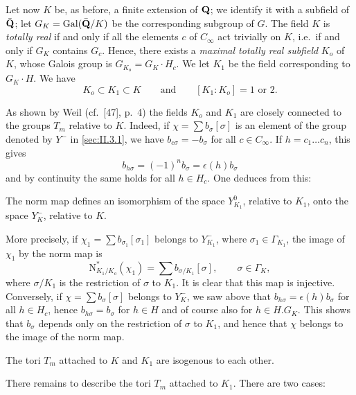 Let now $K$ be, as before, a finite extension of $\mathbf{Q}$; we identify it
with a subfield of $\bar{\mathbf{Q}}$; let $G_K = \mathrm{Gal}(\bar{\mathbf{Q}}/K)$ be the
corresponding subgroup of $G$.  The field $K$ is \emph{totally real} if
and only if all the elements $c$ of $C_\infty$ act trivially on $K$,
i.e.~if and only if $G_K$ contains $G_c$.  Hence, there exists a
\emph{maximal totally real subfield} $K_o$ of $K$, whose Galois group is
$G_{K_o} = G_K \cdot H_c$.  We let $K_1$ be the field corresponding to
$G_K \cdot H$.  We have
\[
K_o \subset K_1 \subset K \qquad\text{and}\qquad [K_1 : K_o] = 1
\text{ or } 2.
\]

As shown by Weil (cf.~[47], p.~4) the fields $K_o$ and
$K_1$ are closely connected to the groups $T_m$ relative to $K$.
Indeed, if $\chi = \sum b_\sigma[\sigma]$ is an element of the group
denoted by $Y^-$ in \ref{sec:II.3.1}, we have $b_{c\sigma} = -b_\sigma$ for all
$c \in C_\infty$.  If $h = c_1 \ldots c_n$, this gives
\[
b_{h\sigma} = (-1)^n b_\sigma = \epsilon(h) b_\sigma
\]
and by continuity the same holds for all $h \in H_c$.  One deduces from
this:

\begin{proposition}\label{prop:II.3.3.1}
The norm map defines an isomorphism of the space $Y^0_{K_1}$, relative
to $K_1$, onto the space $Y^-_K$, relative to $K$.
\end{proposition}

More precisely, if $\chi_1 = \sum b_{\sigma_1}[\sigma_1]$ belongs to
$Y^-_{K_1}$, where $\sigma_1 \in \Gamma_{K_1}$, the image of $\chi_1$ by
the norm map is
\[
\mathrm{N}^*_{K_1/K_o}(\chi_1) = \sum b_{\sigma/K_1}[\sigma], \qquad
\sigma \in \Gamma_K,
\]
where $\sigma/K_1$ is the restriction of $\sigma$ to $K_1$.  It is clear
that this map is injective.  Conversely, if
$\chi = \sum b_\sigma[\sigma]$ belongs to $Y^-_K$, we saw above that
$b_{h\sigma} = \epsilon(h)b_\sigma$ for all $h \in H_c$, hence
$b_{h\sigma} = b_\sigma$ for $h \in H$ and of course also for
$h \in H.G_K$.  This shows that $b_\sigma$ depends only on the
restriction of $\sigma$ to $K_1$, and hence that $\chi$ belongs to the
image of the norm map.

\begin{corollary}\label{cor:II.3.3.1}
The tori $T_m$ attached to $K$ and $K_1$ are isogenous to each other.
\end{corollary}

There remains to describe the tori $T_m$ attached to $K_1$.  There are
two cases:

